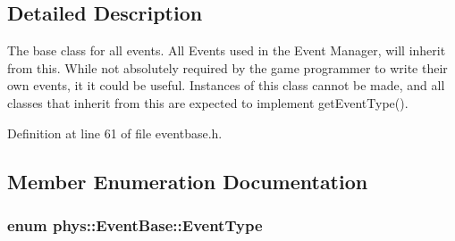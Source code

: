 \subsection{Detailed Description}
The base class for all events. All Events used in the Event Manager, will inherit from this. While not absolutely required by the game programmer to write their own events, it it could be useful. Instances of this class cannot be made, and all classes that inherit from this are expected to implement getEventType(). 

Definition at line 61 of file eventbase.h.



\subsection{Member Enumeration Documentation}
\hypertarget{classphys_1_1EventBase_a5e6a8564e127f654123f0bf6a2751923}{
\subsubsection[{EventType}]{\setlength{\rightskip}{0pt plus 5cm}enum {\bf phys::EventBase::EventType}}}
\label{dd/d80/classphys_1_1EventBase_a5e6a8564e127f654123f0bf6a2751923}
